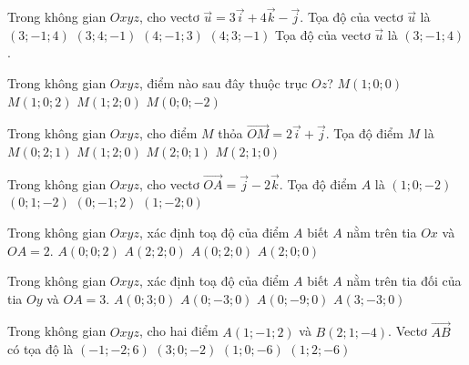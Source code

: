 \begin{ex}
	Trong không gian $Oxyz$, cho vectơ $\overrightarrow{u}=3\overrightarrow{i}+4\overrightarrow{k}-\overrightarrow{j}$. Tọa độ của vectơ $\overrightarrow{u}$ là
	\choice
	{\True $(3;-1;4)$}
	{$(3;4;-1)$}
	{$(4;-1;3)$}
	{$(4;3;-1)$}
	\loigiai
	{
		Tọa độ của vectơ $\overrightarrow{u}$ là $(3;-1;4)$.
	}
\end{ex} 

\begin{ex}
	Trong không gian $Oxyz$, điểm nào sau đây thuộc trục $Oz$?
	\choice
	{$M(1;0;0)$}
	{$M(1;0;2)$}
	{$M(1;2;0)$}
	{\True $M(0;0;-2)$}
\end{ex} 

\begin{ex}%
	Trong không gian $Oxyz$, cho điểm $M$ thỏa $\vec{OM} = 2\vec{i} + \vec{j}$. Tọa độ điểm $M$ là
	\choice
	{$M(0;2;1)$}
	{$M(1;2;0)$}
	{$M(2;0;1)$}
	{\True$M(2;1;0)$}
\end{ex} 

\begin{ex}%
	Trong không gian $Oxyz$, cho vectơ $\overrightarrow{OA}=\overrightarrow{j}-2\overrightarrow{k}$. Tọa độ điểm $A$ là
	\choice
	{$(1;0;-2)$}
	{\True $(0;1;-2)$}
	{$(0;-1;2)$}
	{$(1;-2;0)$}
\end{ex} 

\begin{ex}
	Trong không gian $O x y z$, xác định toạ độ của điểm $A$ biết $A$ nằm trên tia $O x$ và $O A=2$.
	\choice
	{$A(0;0;2)$}
	{$A(2;2;0)$}
	{$A(0;2;0)$}
	{\True $A(2;0;0)$}
\end{ex} 

\begin{ex}
	Trong không gian $O x y z$, xác định toạ độ của điểm $A$ biết $A$ nằm trên tia đối của tia $O y$ và $O A=3$.
	\choice
	{$A(0;3;0)$}
	{\True $A(0;-3;0)$}
	{$A(0;-9;0)$}
	{$A(3;-3;0)$}
\end{ex} 

\begin{ex}
	Trong không gian $Oxyz$, cho hai điểm $A(1;-1;2)$ và $B(2;1;-4)$. Vectơ $\vec{AB}$ có tọa độ là
	\choice
	{$(-1;-2;6)$}
	{$(3;0;-2)$}
	{$(1;0;-6)$}
	{\True $(1;2;-6)$}
\end{ex} 

